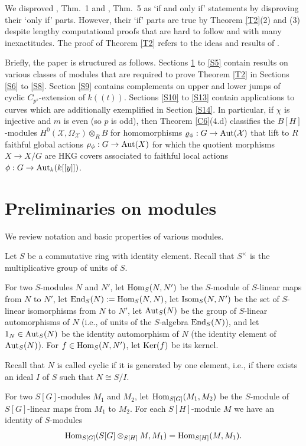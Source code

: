 \documentclass[11pt]{amsart}
\def\Aut{\textup{Aut}}
\def\End{\textup{End}}
\def\Hom{\textup{Hom}}
\def\Isom{\textup{Isom}}
\def\Ker{\textup{Ker}}
\begin{document}
We disproved \cite{KT1}, Thm.\ 1 and \cite{KT2}, Thm.\ 5 as `if and only if' statements by disproving their `only if' parts. However, their `if' parts are true by Theorem \ref{T2}(2) and (3) despite lengthy computational proofs that are hard to follow and with many inexactitudes. The proof of Theorem \ref{T2} refers to the ideas and results of \cite{KT1}.

Briefly, the paper is structured as follows. Sections \ref{S2} to \ref{S5} contain results on various classes of modules that are required to prove Theorem \ref{T2} in Sections \ref{S6} to \ref{S8}. Section \ref{S9} contains complements on upper and lower jumps of cyclic $C_{p^s}$-extension of $k((t))$. Sections \ref{S10} to \ref{S13} contain applications to curves which are additionally exemplified in Section \ref{S14}. In particular, if $\chi$ is injective and $m$ is even (so $p$ is odd), then Theorem \ref{C6}(4.d) classifies the $B[H]$-modules $H^0(\mathcal X,\Omega_{\mathcal X})\otimes_R B$ for homomorphisms $\varrho_{\phi}:G\rightarrow\Aut(\mathcal X)$ that lift to $R$ faithful global actions $\rho_{\phi}:G\rightarrow\Aut(X)$ for which the quotient morphisms $X\rightarrow X/G$ are HKG covers associated to faithful local actions $\phi:G\rightarrow\Aut_k(k[[y]])$. 
 
\section{Preliminaries on modules}\label{S2}

We review notation and basic properties of various modules.

Let $S$ be a commutative ring with identity element. Recall that $S^{\times}$ is the multiplicative group of units of $S$. 

For two $S$-modules $N$ and $N'$, let $\Hom_{S}(N,N')$ be the $S$-module of $S$-linear maps from $N$ to $N'$, let $\End_{S}(N):=\Hom_{S}(N,N)$, let $\Isom_{S}(N,N')$ be the set of $S$-linear isomorphisms from $N$ to $N'$, let $\Aut_{S}(N)$ be the group of $S$-linear automorphisms of $N$ (i.e., of units of the $S$-algebra $\End_{S}(N)$), and let $1_N\in\Aut_{S}(N)$ be the identity automorphism of $N$ (the identity element of $\Aut_{S}(N)$). For $f\in\Hom_{S}(N,N')$, let $\Ker(f)$ be its kernel. 

Recall that $N$ is called cyclic if it is generated by one element, i.e., if there exists an ideal $I$ of $S$ such that $N\cong S/I$. 

For two $S[G]$-modules $M_1$ and $M_2$, let $\Hom_{S[G]}(M_1,M_2)$ be the $S$-module of $S[G]$-linear maps from $M_1$ to $M_2$. For each $S[H]$-module $M$ we have an identity of $S$-modules
$$\Hom_{S[G]}(S[G]\otimes_{S[H]} M,M_1)=\Hom_{S[H]}(M,M_1).$$
\end{document}
